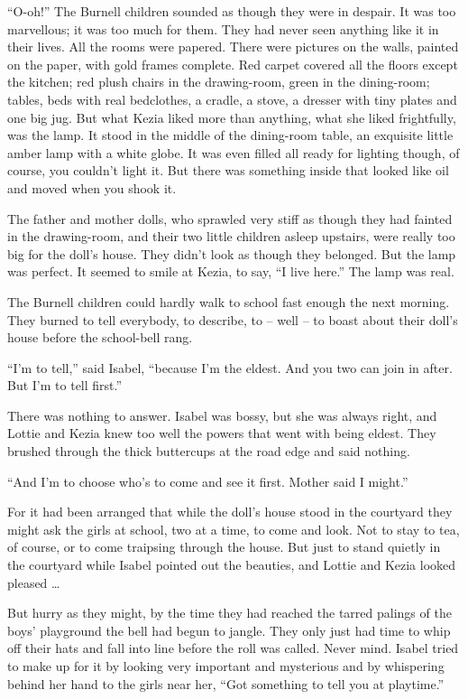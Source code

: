 \documentclass[10pt,a4paper]{article}
\begin{document}
“O-oh!” The Burnell children sounded as though they were in despair. It was too marvellous; it was too much for them. They had never seen anything like it in their lives. All the rooms were papered. There were pictures on the walls, painted on the paper, with gold frames complete. Red carpet covered all the floors except the kitchen; red plush chairs in the drawing-room, green in the dining-room; tables, beds with real bedclothes, a cradle, a stove, a dresser with tiny plates and one big jug. But what Kezia liked more than anything, what she liked frightfully, was the lamp. It stood in the middle of the dining-room table, an exquisite little amber lamp with a white globe. It was even filled all ready for lighting though, of course, you couldn’t light it. But there was something inside that looked like oil and moved when you shook it.

The father and mother dolls, who sprawled very stiff as though they had fainted in the drawing-room, and their two little children asleep upstairs, were really too big for the doll’s house. They didn’t look as though they belonged. But the lamp was perfect. It seemed to smile at Kezia, to say, “I live here.” The lamp was real.

The Burnell children could hardly walk to school fast enough the next morning. They burned to tell everybody, to describe, to – well – to boast about their doll’s house before the school-bell rang.

“I’m to tell,” said Isabel, “because I’m the eldest. And you two can join in after. But I’m to tell first.”

There was nothing to answer. Isabel was bossy, but she was always right, and Lottie and Kezia knew too well the powers that went with being eldest. They brushed through the thick buttercups at the road edge and said nothing.

“And I’m to choose who’s to come and see it first. Mother said I might.”

For it had been arranged that while the doll’s house stood in the courtyard they might ask the girls at school, two at a time, to come and look. Not to stay to tea, of course, or to come traipsing through the house. But just to stand quietly in the courtyard while Isabel pointed out the beauties, and Lottie and Kezia looked pleased …

But hurry as they might, by the time they had reached the tarred palings of the boys’ playground the bell had begun to jangle. They only just had time to whip off their hats and fall into line before the roll was called. Never mind. Isabel tried to make up for it by looking very important and mysterious and by whispering behind her hand to the girls near her, “Got something to tell you at playtime.”
\end{document}
